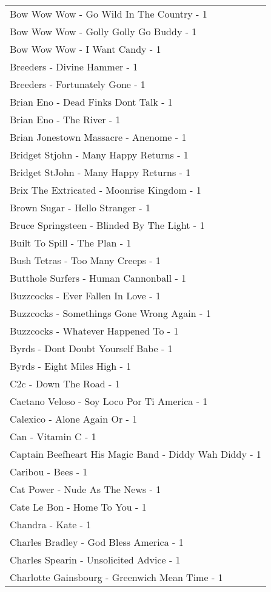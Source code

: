 \documentclass[
]{article}
\begin{document}
\begin{longtable}{l}
Bow Wow Wow - Go Wild In The Country - 1 \\ 
Bow Wow Wow - Golly Golly Go Buddy - 1 \\ 
Bow Wow Wow - I Want Candy - 1 \\ 
Breeders - Divine Hammer - 1 \\ 
Breeders - Fortunately Gone - 1 \\ 
Brian Eno - Dead Finks Dont Talk - 1 \\ 
Brian Eno - The River - 1 \\ 
Brian Jonestown Massacre - Anenome - 1 \\ 
Bridget Stjohn - Many Happy Returns - 1 \\ 
Bridget StJohn - Many Happy Returns - 1 \\ 
Brix The Extricated - Moonrise Kingdom - 1 \\ 
Brown Sugar - Hello Stranger - 1 \\ 
Bruce Springsteen - Blinded By The Light - 1 \\ 
Built To Spill - The Plan - 1 \\ 
Bush Tetras - Too Many Creeps - 1 \\ 
Butthole Surfers - Human Cannonball - 1 \\ 
Buzzcocks - Ever Fallen In Love - 1 \\ 
Buzzcocks - Somethings Gone Wrong Again - 1 \\ 
Buzzcocks - Whatever Happened To - 1 \\ 
Byrds - Dont Doubt Yourself Babe - 1 \\ 
Byrds - Eight Miles High - 1 \\ 
C2c - Down The Road - 1 \\ 
Caetano Veloso - Soy Loco Por Ti America - 1 \\ 
Calexico - Alone Again Or - 1 \\ 
Can - Vitamin C - 1 \\ 
Captain Beefheart His Magic Band - Diddy Wah Diddy - 1 \\ 
Caribou - Bees - 1 \\ 
Cat Power - Nude As The News - 1 \\ 
Cate Le Bon - Home To You - 1 \\ 
Chandra - Kate - 1 \\ 
Charles Bradley - God Bless America - 1 \\ 
Charles Spearin - Unsolicited Advice - 1 \\ 
Charlotte Gainsbourg - Greenwich Mean Time - 1 \\ 

\end{longtable}
\end{document}
